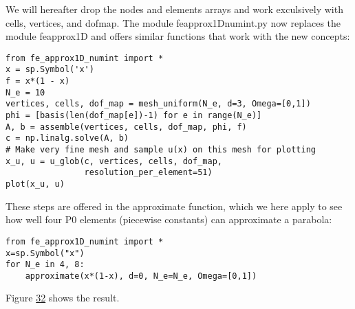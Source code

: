 \documentclass[../main.tex]{subfiles}
\begin{document}
We will hereafter drop the nodes and elements arrays and work exculsively
with cells, vertices, and dof\textunderscore map. The module fe\textunderscore approx1D\textunderscore numint.py
now replaces the module fe\textunderscore approx1D and offers similar functions that work
with the new concepts:
\begin{lstlisting}[numbers=none]
from fe_approx1D_numint import *
x = sp.Symbol('x')
f = x*(1 - x)
N_e = 10
vertices, cells, dof_map = mesh_uniform(N_e, d=3, Omega=[0,1])
phi = [basis(len(dof_map[e])-1) for e in range(N_e)]
A, b = assemble(vertices, cells, dof_map, phi, f)
c = np.linalg.solve(A, b)
# Make very fine mesh and sample u(x) on this mesh for plotting
x_u, u = u_glob(c, vertices, cells, dof_map,
				resolution_per_element=51)
plot(x_u, u)	
\end{lstlisting}
These steps are offered in the approximate function, which we here apply to see
how well four P0 elements (piecewise constants) can approximate a parabola:
\begin{lstlisting}[numbers=none]
from fe_approx1D_numint import *
x=sp.Symbol("x")
for N_e in 4, 8:
	approximate(x*(1-x), d=0, N_e=N_e, Omega=[0,1])	
\end{lstlisting}
Figure \hyperref[fig:img_32]{32} shows the result.
\end{document}
